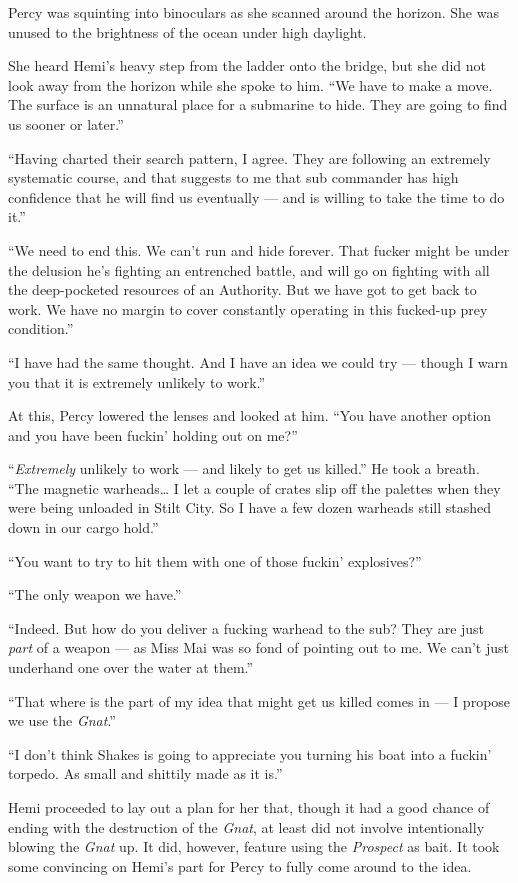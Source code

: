 \documentclass[
]{scrbook}
\begin{document}
Percy was squinting into binoculars as she scanned around the horizon.
She was unused to the brightness of the ocean under high daylight.

She heard Hemi's heavy step from the ladder onto the bridge, but she did
not look away from the horizon while she spoke to him. ``We have to make
a move. The surface is an unnatural place for a submarine to hide. They
are going to find us sooner or later.''

``Having charted their search pattern, I agree. They are following an
extremely systematic course, and that suggests to me that sub commander
has high confidence that he will find us eventually --- and is willing
to take the time to do it.''

``We need to end this. We can't run and hide forever. That fucker might
be under the delusion he's fighting an entrenched battle, and will go on
fighting with all the deep-pocketed resources of an Authority. But we
have got to get back to work. We have no margin to cover constantly
operating in this fucked-up prey condition.''

``I have had the same thought. And I have an idea we could try ---
though I warn you that it is extremely unlikely to work.''

At this, Percy lowered the lenses and looked at him. ``You have another
option and you have been fuckin' holding out on me?''

``\emph{Extremely} unlikely to work --- and likely to get us killed.''
He took a breath. ``The magnetic warheads\ldots{} I let a couple of
crates slip off the palettes when they were being unloaded in Stilt
City. So I have a few dozen warheads still stashed down in our cargo
hold.''

``You want to try to hit them with one of those fuckin' explosives?''

``The only weapon we have.''

``Indeed. But how do you deliver a fucking warhead to the sub? They are
just \emph{part} of a weapon --- as Miss Mai was so fond of pointing out
to me. We can't just underhand one over the water at them.''

``That where is the part of my idea that might get us killed comes in
--- I propose we use the \emph{Gnat}.''

``I don't think Shakes is going to appreciate you turning his boat into
a fuckin' torpedo. As small and shittily made as it is.''

Hemi proceeded to lay out a plan for her that, though it had a good
chance of ending with the destruction of the \emph{Gnat}, at least did
not involve intentionally blowing the \emph{Gnat} up. It did, however,
feature using the \emph{Prospect} as bait. It took some convincing on
Hemi's part for Percy to fully come around to the idea.
\end{document}
